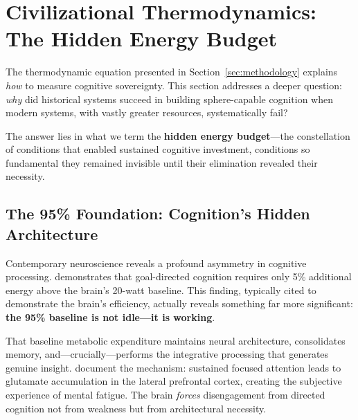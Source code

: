 % 
%
%

\section{Civilizational Thermodynamics: The Hidden Energy Budget}
\label{sec:civilizational}

The thermodynamic equation presented in Section~\ref{sec:methodology} explains \textit{how} to measure cognitive sovereignty. This section addresses a deeper question: \textit{why} did historical systems succeed in building sphere-capable cognition when modern systems, with vastly greater resources, systematically fail?

The answer lies in what we term the \textbf{hidden energy budget}---the constellation of conditions that enabled sustained cognitive investment, conditions so fundamental they remained invisible until their elimination revealed their necessity.

\subsection{The 95\% Foundation: Cognition's Hidden Architecture}

Contemporary neuroscience reveals a profound asymmetry in cognitive processing. \citet{jamadar2025} demonstrates that goal-directed cognition requires only 5\% additional energy above the brain's 20-watt baseline. This finding, typically cited to demonstrate the brain's efficiency, actually reveals something far more significant: \textbf{the 95\% baseline is not idle---it is working}.

That baseline metabolic expenditure maintains neural architecture, consolidates memory, and---crucially---performs the integrative processing that generates genuine insight. \citet{wiehler2022} document the mechanism: sustained focused attention leads to glutamate accumulation in the lateral prefrontal cortex, creating the subjective experience of mental fatigue. The brain \textit{forces} disengagement from directed cognition not from weakness but from architectural necessity.

